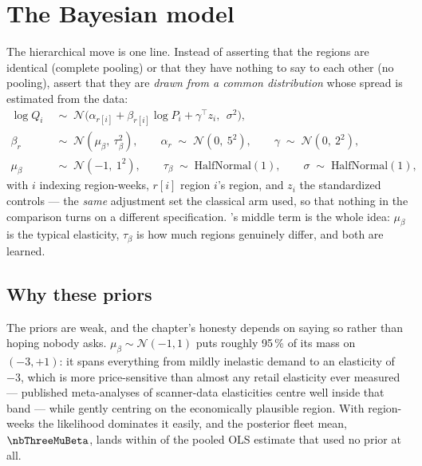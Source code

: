 \section{The Bayesian model}
\label{sec:pe:bayes}

The hierarchical move is one line. Instead of asserting that the regions are identical (complete
pooling) or that they have nothing to say to each other (no pooling), assert that they are
\emph{drawn from a common distribution} whose spread is estimated from the data:
%
\begin{align}
  \log Q_i &\;\sim\; \mathcal N\Big(\alpha_{r[i]} + \beta_{r[i]} \log P_i
              + \gamma^{\top} z_i,\ \ \sigma^{2}\Big), \label{eq:pe:lik}\\[2pt]
  \beta_r &\;\sim\; \mathcal N\!\left(\mu_\beta,\ \tau_\beta^{2}\right), \qquad
  \alpha_r \;\sim\; \mathcal N\!\left(0,\ 5^{2}\right), \qquad
  \gamma \;\sim\; \mathcal N\!\left(0,\ 2^{2}\right), \label{eq:pe:slopes}\\[2pt]
  \mu_\beta &\;\sim\; \mathcal N\!\left(-1,\ 1^{2}\right), \qquad
  \tau_\beta \;\sim\; \text{HalfNormal}(1), \qquad
  \sigma \;\sim\; \text{HalfNormal}(1), \label{eq:pe:priors}
\end{align}
%
with $i$ indexing region-weeks, $r[i]$ region $i$'s region, and $z_i$ the standardized controls ---
the \emph{same} adjustment set the classical arm used, so that nothing in the comparison turns on a
different specification. 's middle term is the whole idea: $\mu_\beta$ is the
typical elasticity, $\tau_\beta$ is how much regions genuinely differ, and both are learned.

\subsection*{Why these priors}

The priors are weak, and the chapter's honesty depends on saying so rather than hoping nobody asks.
$\mu_\beta \sim \mathcal N(-1, 1)$ puts roughly 95\,\% of its mass on $(-3, +1)$: it spans
everything from mildly inelastic demand to an elasticity of $-3$, which is more price-sensitive
than almost any retail elasticity ever measured --- published meta-analyses of scanner-data
elasticities centre well inside that band \citep{tellis1988, bijmolt2005} --- while gently
centring on the economically plausible region. With \nbThreeNObs{} region-weeks the likelihood
dominates it easily, and the posterior fleet mean, $\nbThreeMuBeta$, lands within
\nbThreeMuVsOls{} of the pooled OLS estimate that used no prior at all.

